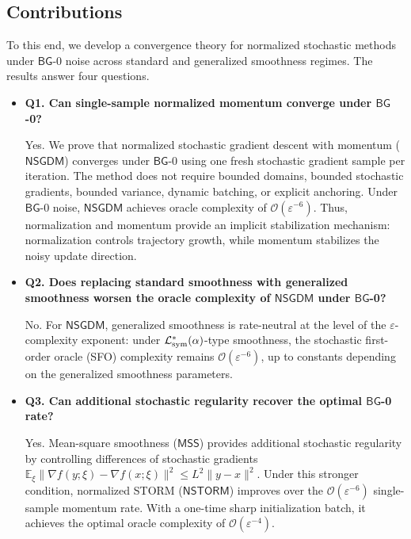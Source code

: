 \documentclass[letter,11pt]{article}
\newcommand{\E}{\mathbb{E}}
\newcommand{\Ocal}{\mathcal{O}}
\newcommand{\Lcal}{\mathcal{L}}
\begin{document}
\subsection{Contributions}
\label{subsec:contribution}
To this end, we develop a convergence theory for normalized stochastic methods under $\mathsf{BG}$-0 noise across standard and generalized smoothness regimes. The results answer four questions.
\begin{itemize}[leftmargin=*,label={}]
    \item \textbf{Q1. Can single-sample normalized momentum converge under $\mathsf{BG}$-0?}

    Yes. We prove that normalized stochastic gradient descent with momentum ($\mathsf{NSGDM}$) converges under $\mathsf{BG}$-0 using one fresh stochastic gradient sample per iteration. The method does not require bounded domains, bounded stochastic gradients, bounded variance, dynamic batching, or explicit anchoring. Under $\mathsf{BG}$-0 noise, $\mathsf{NSGDM}$ achieves oracle complexity of $\Ocal(\varepsilon^{-6})$. Thus, normalization and momentum provide an implicit stabilization mechanism: normalization controls trajectory growth, while momentum stabilizes the noisy update direction.

    \item \textbf{Q2. Does replacing standard smoothness with generalized smoothness worsen the oracle complexity of $\mathsf{NSGDM}$ under $\mathsf{BG}$-0?}

    No. For $\mathsf{NSGDM}$, generalized smoothness is rate-neutral at the level of the $\varepsilon$-complexity exponent: under $\Lcal_{\rm sym}^*(\alpha)$-type smoothness, the stochastic first-order oracle (SFO) complexity remains $\Ocal(\varepsilon^{-6})$, up to constants depending on the generalized smoothness parameters.

    \item \textbf{Q3. Can additional stochastic regularity recover the optimal $\mathsf{BG}$-0 rate?}

    Yes. Mean-square smoothness ($\mathsf{MSS}$) provides additional stochastic regularity by controlling differences of stochastic gradients $\E_\xi \bigl\| \nabla f(y;\xi)-\nabla f(x;\xi) \bigr\|^2 \le L^2\|y-x\|^2.$ Under this stronger condition, normalized STORM ($\mathsf{NSTORM}$) improves over the $\Ocal(\varepsilon^{-6})$ single-sample momentum rate. With a one-time sharp initialization batch, it achieves the optimal oracle complexity of $\Ocal(\varepsilon^{-4})$.


\end{itemize}
\end{document}
